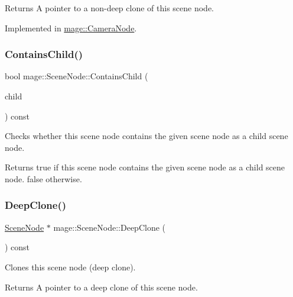 \begin{DoxyReturn}{Returns}
A pointer to a non-\/deep clone of this scene node. 
\end{DoxyReturn}


Implemented in \hyperlink{classmage_1_1_camera_node_adf9a95250d1fd7e6bb9a5850a0aa7817}{mage\+::\+Camera\+Node}.

\hypertarget{classmage_1_1_scene_node_a99c86a1d18b41d4c5ce0384ba53a0952}{}\label{classmage_1_1_scene_node_a99c86a1d18b41d4c5ce0384ba53a0952} 
\subsubsection{\texorpdfstring{Contains\+Child()}{ContainsChild()}}
{\footnotesize\ttfamily bool mage\+::\+Scene\+Node\+::\+Contains\+Child (\begin{DoxyParamCaption}\item[{const \hyperlink{classmage_1_1_scene_node}{Scene\+Node} $\ast$}]{child }\end{DoxyParamCaption}) const}

Checks whether this scene node contains the given scene node as a child scene node.

\begin{DoxyReturn}{Returns}
{\ttfamily true} if this scene node contains the given scene node as a child scene node. {\ttfamily false} otherwise. 
\end{DoxyReturn}
\hypertarget{classmage_1_1_scene_node_a5dcfacd607e3f8554f7eac73a51be334}{}\label{classmage_1_1_scene_node_a5dcfacd607e3f8554f7eac73a51be334} 
\subsubsection{\texorpdfstring{Deep\+Clone()}{DeepClone()}}
{\footnotesize\ttfamily \hyperlink{classmage_1_1_scene_node}{Scene\+Node} $\ast$ mage\+::\+Scene\+Node\+::\+Deep\+Clone (\begin{DoxyParamCaption}{ }\end{DoxyParamCaption}) const}

Clones this scene node (deep clone).

\begin{DoxyReturn}{Returns}
A pointer to a deep clone of this scene node. 
\end{DoxyReturn}
\hypertarget{classmage_1_1_scene_node_ab2113dd62439d81a31bdfdf44d02061e}{}\label{classmage_1_1_scene_node_ab2113dd62439d81a31bdfdf44d02061e} 

